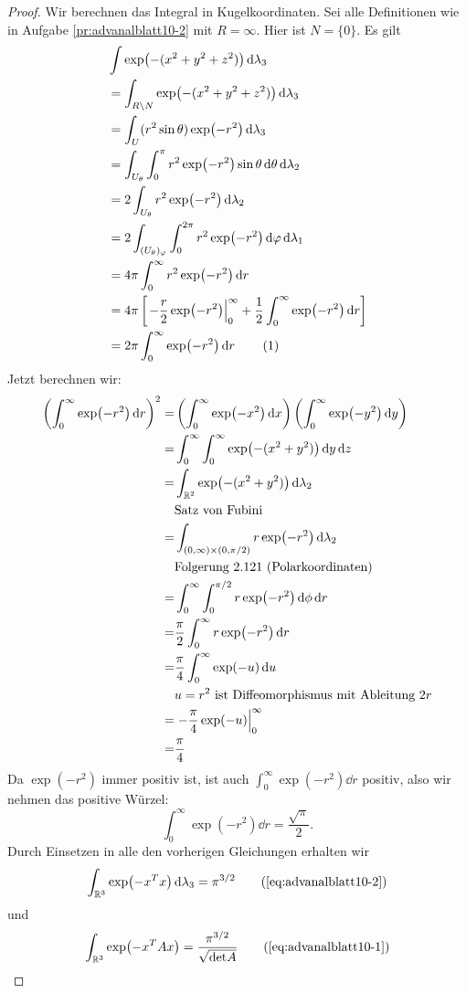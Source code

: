 \begin{proof}
	Wir berechnen das Integral in Kugelkoordinaten. Sei alle Definitionen wie in Aufgabe \ref{pr:advanalblatt10-2} mit $R=\infty$. Hier ist $N=\{0\} $. Es gilt
	\begin{align*}
	&\int\exp(-(x^2+y^2+z^2))\dd{\lambda_3}\\
	&=\int_{R\backslash N}\exp(-(x^2+y^2+z^2))\dd{\lambda_3}\\
	&=\int_{U} (r^2\sin\theta)\exp(-r^2)\dd{\lambda_3}\\
	&=\int_{U_\theta}\int_0^\pi r^2\exp(-r^2)\sin\theta\dd{\theta}\dd{\lambda_2}\\
	&=2\int_{U_\theta}r^2\exp(-r^2)\dd{\lambda_2}\\
	&=2\int_{(U_\theta)_\varphi}\int_0^{2\pi}r^2\exp(-r^2)\dd{\varphi}\dd{\lambda_1}\\
	&=4\pi\int_0^\infty r^2\exp(-r^2)\dd{r}\\
	&=4\pi\left[ \left. -\frac{r}{2}\exp(-r^2)\right|_0^\infty+\frac{1}{2}\int_0^\infty \exp(-r^2)\dd{r} \right]\\
	&=2\pi\int_0^\infty \exp(-r^2)\dd{r}\addtocounter{equation}{1}\tag{\theequation}\label{eq:advanalblatt10-2}
	\end{align*}
	Jetzt berechnen wir:
	\begin{align*}
		\left( \int_0^\infty \exp(-r^2)\dd{r} \right)^2=& \left( \int_0^\infty \exp(-x^2)\dd{x} \right) \left( \int_0^\infty \exp(-y^2)\dd{y} \right) \\
		=&\int_0^\infty \int_0^\infty \exp(-(x^2+y^2))\dd{y}\dd{z}\\
		=&\int_{\mathbb{R}^2}\exp(-(x^2+y^2))\dd{\lambda_2} \\ &\text{Satz von Fubini}\\
		=&\int_{(0,\infty)\times(0,\pi / 2)}r\exp(-r^2)\dd{\lambda_2} \\ &\text{Folgerung 2.121 (Polarkoordinaten)}\\
		=&\int_0^\infty\int_0^{\pi /2}r\exp(-r^2)\dd{\phi}\dd{r}\\
		=&\frac{\pi}{2}\int_0^\infty r\exp(-r^2)\dd{r}\\
		=&\frac{\pi}{4}\int_0^\infty \exp(-u)\dd{u} \\
		 & u=r^2\text{ ist Diffeomorphismus mit Ableitung }2r\\
		=&\left.-\frac{\pi}{4}\exp(-u)\right|_0^\infty\\
			=&\frac{\pi}{4}
	\end{align*}
	Da $\exp(-r^2)$ immer positiv ist, ist auch $\int_0^\infty \exp(-r^2)\dd{r}$ positiv, also wir nehmen das positive Würzel:
	\[
		\int_0^\infty\exp(-r^2)\dd{r}=\frac{\sqrt{\pi}}{2}
	.\] 
	Durch Einsetzen in alle den vorherigen Gleichungen erhalten wir
	\begin{equation}
		\int_{\R^3}\exp(-x^Tx)\dd{\lambda_3}=\pi^{3 / 2}\tag{\ref{eq:advanalblatt10-2}}
	\end{equation}
	und
	\begin{equation}
		\int_{\R^3}\exp(-x^TAx)=\frac{\pi^{3 / 2}}{\sqrt{\text{det} A} }\tag{\ref{eq:advanalblatt10-1}}
	\end{equation}
\end{proof}

